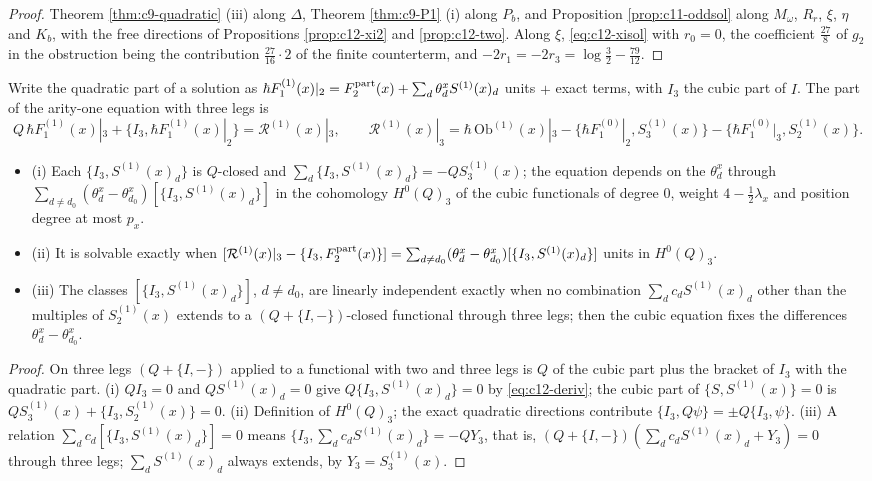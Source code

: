 \begin{proof}
Theorem \ref{thm:c9-quadratic} (iii) along $\Delta$, Theorem \ref{thm:c9-P1} (i) along $P_b$, and Proposition \ref{prop:c11-oddsol} along $M_\omega$, $R_r$, $\xi$, $\eta$ and $K_b$, with the free directions of Propositions \ref{prop:c12-xi2} and \ref{prop:c12-two}. Along $\xi$, \eqref{eq:c12-xisol} with $r_0=0$, the coefficient $\tfrac{27}8$ of $g_2$ in the obstruction being the contribution $\tfrac{27}{16}\cdot2$ of the finite counterterm, and $-2r_1=-2r_3=\log\tfrac32-\tfrac{79}{12}$.
\end{proof}

\begin{theorem}
\label{thm:c12-cubic}
Write the quadratic part of a solution as $\hbar F_1^{(1)}(x)|_2=F^{\rm part}_2(x)+\sum_d\theta^x_dS^{(1)}(x)_d$ units $+$ exact terms, with $I_3$ the cubic part of $I$. The part of the arity-one equation with three legs is
\[
Q\,\hbar F_1^{(1)}(x)|_3+\{I_3,\hbar F_1^{(1)}(x)|_2\}=\mathcal R^{(1)}(x)|_3,\qquad \mathcal R^{(1)}(x)|_3=\hbar\,\mathrm{Ob}^{(1)}(x)|_3-\{\hbar F_1^{(0)}|_2,S^{(1)}_3(x)\}-\{\hbar F_1^{(0)}|_3,S^{(1)}_2(x)\}.
\]
\begin{itemize}
\item (i) Each $\{I_3,S^{(1)}(x)_d\}$ is $Q$-closed and $\sum_d\{I_3,S^{(1)}(x)_d\}=-QS^{(1)}_3(x)$; the equation depends on the $\theta^x_d$ through $\sum_{d\neq d_0}(\theta^x_d-\theta^x_{d_0})[\{I_3,S^{(1)}(x)_d\}]$ in the cohomology $H^0(Q)_3$ of the cubic functionals of degree $0$, weight $4-\tfrac12\lambda_x$ and position degree at most $p_x$.
\item (ii) It is solvable exactly when $[\mathcal R^{(1)}(x)|_3-\{I_3,F^{\rm part}_2(x)\}]=\sum_{d\neq d_0}(\theta^x_d-\theta^x_{d_0})[\{I_3,S^{(1)}(x)_d\}]$ units in $H^0(Q)_3$.
\item (iii) The classes $[\{I_3,S^{(1)}(x)_d\}]$, $d\neq d_0$, are linearly independent exactly when no combination $\sum_dc_dS^{(1)}(x)_d$ other than the multiples of $S^{(1)}_2(x)$ extends to a $(Q+\{I,-\})$-closed functional through three legs; then the cubic equation fixes the differences $\theta^x_d-\theta^x_{d_0}$.
\end{itemize}
\end{theorem}

\begin{proof}
On three legs $(Q+\{I,-\})$ applied to a functional with two and three legs is $Q$ of the cubic part plus the bracket of $I_3$ with the quadratic part. (i) $QI_3=0$ and $QS^{(1)}(x)_d=0$ give $Q\{I_3,S^{(1)}(x)_d\}=0$ by \eqref{eq:c12-deriv}; the cubic part of $\{S,S^{(1)}(x)\}=0$ is $QS^{(1)}_3(x)+\{I_3,S^{(1)}_2(x)\}=0$. (ii) Definition of $H^0(Q)_3$; the exact quadratic directions contribute $\{I_3,Q\psi\}=\pm Q\{I_3,\psi\}$. (iii) A relation $\sum_dc_d[\{I_3,S^{(1)}(x)_d\}]=0$ means $\{I_3,\sum_dc_dS^{(1)}(x)_d\}=-QY_3$, that is, $(Q+\{I,-\})(\sum_dc_dS^{(1)}(x)_d+Y_3)=0$ through three legs; $\sum_dS^{(1)}(x)_d$ always extends, by $Y_3=S^{(1)}_3(x)$.
\end{proof}


